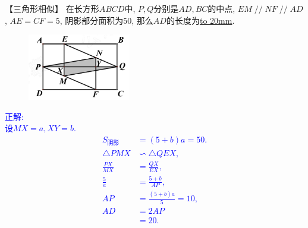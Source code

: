 \item {
    【三角形相似】
    在长方形$ABCD$中, $P,Q$分别是$AD,BC$的中点, $EM\mathop{//}NF\mathop{//}AD$, $AE=CF=5$, 阴影部分面积为50, 那么$AD$的长度为\underline{\hbox to 20mm{}}.
    \begin{figure}[H] 
        \centering
        \includegraphics[width=0.4\textwidth]{./pics/Chapter_2/1.png}
    \end{figure}
    \ifshowSolution 
        \fangsong{}\textcolor{blue}{
            正解: \\
            设$MX=a, XY =b$.\\
            \begin{align*}
                S_{阴影} &= (5+b)a = 50. \\
                \triangle PMX &\backsim \triangle QEX,\\
                \frac{PX}{MX} &= \frac{QX}{EX}, \\
                \frac{5}{a} &= \frac{5+b}{AP}, \\
                AP &= \frac{(5+b)a}{5} = 10, \\
                AD &= 2AP \\
                &= 20. \\
            \end{align*}
        }
    \else
        \vspace{1cm}
    \fi
}


